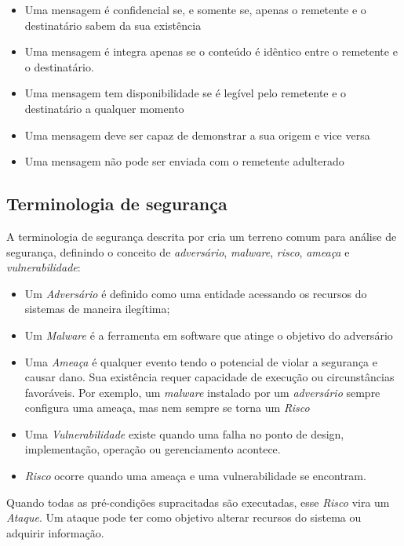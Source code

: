 \documentclass[tcc,capa]{texufpel}
\begin{document}
\begin{itemize}
    \item Uma mensagem é confidencial se, e somente se, apenas o remetente e o destinatário sabem da sua existência
    \item Uma mensagem é integra apenas se o conteúdo é idêntico entre o remetente e o destinatário.
    \item Uma mensagem tem disponibilidade se é legível pelo remetente e o destinatário a qualquer momento
    \item Uma mensagem deve ser capaz de demonstrar a sua origem e vice versa
    \item Uma mensagem não pode ser enviada com o remetente adulterado
\end{itemize}

\subsection{Terminologia de segurança}

A terminologia de segurança descrita por \citet{schiller} cria um terreno comum para análise de segurança, definindo o conceito de \textit{adversário}, \textit{malware}, \textit{risco}, \textit{ameaça} e \textit{vulnerabilidade}:

\begin{itemize}
    \item Um \textit{Adversário} é definido como uma entidade acessando os recursos do sistemas de maneira ilegítima;
    \item Um \textit{Malware} é a ferramenta em software que atinge o objetivo do adversário
    \item Uma \textit{Ameaça} é qualquer evento tendo o potencial de violar a segurança e causar dano. Sua existência requer capacidade de execução ou circunstâncias favoráveis. Por exemplo, um \textit{malware} instalado por um \textit{adversário} sempre configura uma ameaça, mas nem sempre se torna um \textit{Risco}
    \item Uma \textit{Vulnerabilidade} existe quando uma falha no ponto de design, implementação, operação ou gerenciamento acontece.
    \item \textit{Risco} ocorre quando uma ameaça e uma vulnerabilidade se encontram.
\end{itemize}

Quando todas as pré-condições supracitadas são executadas, esse \textit{Risco} vira um \textit{Ataque}. Um ataque pode ter como objetivo alterar recursos do sistema ou adquirir informação.
\end{document}
